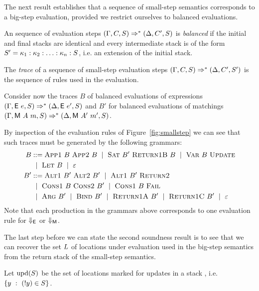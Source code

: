   The next result establishes that a sequence of small-step semantics
  corresponds to a big-step evaluation, provided we restrict ourselves
  to balanced evaluations.

  \begin{definition}
    An sequence of evaluation steps
    $(\Gamma,C,S) \Rightarrow^{*}
    (\Delta,C',S)$ is \emph{balanced} if
    the initial and final stacks are identical and every intermediate
    stack is of the form $S' = \kappa_1:\kappa_2:\ldots:\kappa_n:S$, i.e.\@
    an extension of the initial stack.
  \end{definition}

  \begin{definition}
    The \emph{trace} of a sequence of small-step evaluation
    steps $(\Gamma,C,S) \Rightarrow^{*}
    (\Delta,C',S')$ is the sequence of rules used in the evaluation.
  \end{definition}

  Consider now the traces $B$ of balanced evaluations of expressions
  $(\Gamma,\textsf{E}~e,S)\Rightarrow^{*}(\Delta,\textsf{E}~e',S)$
  and $B'$ for balanced evaluations of matchings
  $(\Gamma,\textsf{M}~A~m,S)\Rightarrow^{*}(\Delta,\textsf{M}~A'~m',S)$.

By inspection of the evaluation rules of Figure~\ref{fig:smallstep} we
can see that such traces must be generated by the following grammars:
\begin{align*}
  B &::= \textsc{App1}~ B~ \textsc{App2}~B ~\mid~
      \textsc{Sat}~B'~ \textsc{Return1B}~B
      ~\mid~ \textsc{Var}~B ~ \textsc{Update} \\
  &~\mid~ \textsc{Let}~B ~\mid~ \varepsilon\\
  B' &::= \textsc{Alt1}~B'~\textsc{Alt2}~B' ~\mid~
       \textsc{Alt1}~B'~\textsc{Return2} \\
    &~\mid~ \textsc{Cons1}~ B ~\textsc{Cons2}~B' ~\mid~
      \textsc{Cons1}~ B~ \textsc{Fail} \\
    &~\mid~ \textsc{Arg}~ B' ~\mid~ \textsc{Bind}~B' 
    ~\mid~ \textsc{Return1A}~B' ~\mid~ \textsc{Return1C}~B' ~\mid~ \varepsilon
\end{align*}
Note that each production in the grammars above corresponds to 
one evaluation rule for $\Downarrow_{\textsf{E}}$ or $\Downarrow_{\textsf{M}}$.

The last step before we can state the second soundness result is
to see that we can recover the set $L$ of locations under evaluation
used in the big-step semantics from the return stack of the small-step
semantics.
\begin{definition}
  Let $\text{upd}(S)$
  be the set of locations marked
  for updates in a stack \retstack, i.e.\@
  $\{ y ~:~ (!y) \in S \}$.
\end{definition}

